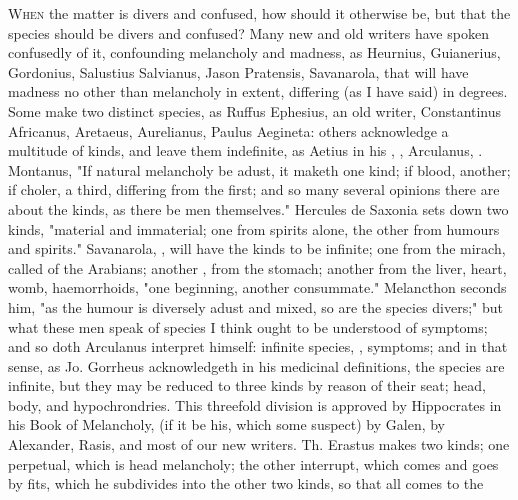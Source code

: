 \lettrine{W}{hen} the matter is divers and confused, how should it otherwise
be, but that the species should be divers and confused? Many new and old
writers have spoken confusedly of it, confounding melancholy and madness, as
Heurnius, Guianerius, Gordonius, Salustius Salvianus,
Jason Pratensis, Savanarola, that will have madness no other than melancholy in
extent, differing (as I have said) in degrees. Some make two distinct species,
as Ruffus Ephesius, an old writer, Constantinus Africanus, Aretaeus,
Aurelianus, Paulus Aegineta: others
acknowledge a multitude of kinds, and leave them indefinite, as Aetius in his
, \Avicenna{},
 Arculanus,
. Montanus,
 "If natural
melancholy be adust, it maketh one kind; if blood, another; if choler, a third,
differing from the first; and so many several opinions there are about the
kinds, as there be men themselves." Hercules de Saxonia
sets down two kinds, "material and immaterial; one from spirits alone, the
other from humours and spirits." Savanarola, , will have the kinds to be infinite;
one from the mirach, called  of the Arabians; another
, from the stomach; another from the liver, heart, womb,
haemorrhoids, "one beginning, another consummate."
Melancthon seconds him, "as the humour is diversely adust
and mixed, so are the species divers;" but what these men speak of species I
think ought to be understood of symptoms; and so doth
Arculanus interpret himself: infinite species, , symptoms; and in that sense, as Jo. Gorrheus acknowledgeth in his
medicinal definitions, the species are infinite, but they may be reduced to
three kinds by reason of their seat; head, body, and hypochrondries. This
threefold division is approved by Hippocrates in his Book of Melancholy, (if it
be his, which some suspect) by Galen,  by Alexander, 
Rasis, 
\Avicenna{} and most of our new writers. Th. Erastus makes two kinds; one
perpetual, which is head melancholy; the other interrupt, which comes and goes
by fits, which he subdivides into the other two kinds, so that all comes to the
